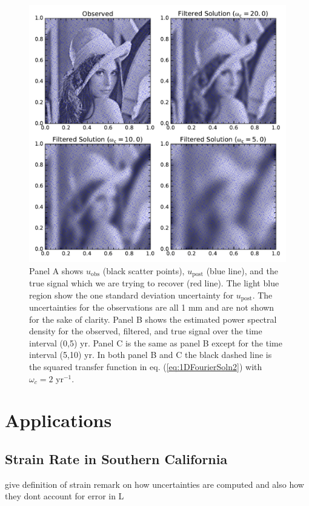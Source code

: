 \documentclass[10pt,a4paper]{article}
\begin{document}
\begin{figure}
\includegraphics[scale=0.8]{figures/fig2}
\caption{Panel A shows $u_\mathrm{obs}$ (black scatter points), $u_\mathrm{post}$ (blue line), and the true signal which we are trying to recover (red line).  The light blue region show the one standard deviation uncertainty for $u_\mathrm{post}$. The uncertainties for the observations are all 1 mm and are not shown for the sake of clarity.  Panel B shows the estimated power spectral density for the observed, filtered, and true signal over the time interval (0,5) yr. Panel C is the same as panel B except for the time interval (5,10) yr.  In both panel B and C the black dashed line is the squared transfer function in eq. (\ref{eq:1DFourierSoln2}) with $\omega_c=2$ yr$^{-1}$.}   
\label{fig:Demo2}
\end{figure}


\section{Applications}\label{sec:Applications}

\subsection{Strain Rate in Southern California}\label{sec:ApplicationsSoCal}
give definition of strain
remark on how uncertainties are computed and also how they dont account for error in L
\end{document}
